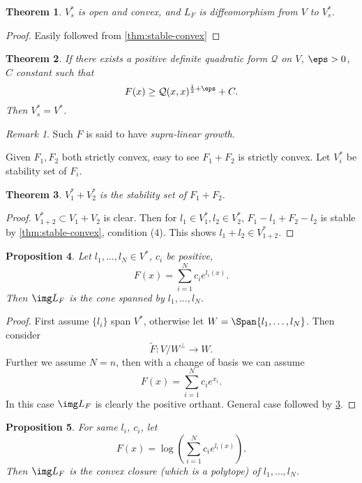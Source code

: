 \documentclass[12pt]{article}
\theoremstyle{plain}\newtheorem{theorem}{Theorem}
\theoremstyle{definition}\newtheorem{definition}[theorem]{Definition}
\theoremstyle{definition}\newtheorem{example}[theorem]{Example}
\theoremstyle{plain}\newtheorem{axiom}[theorem]{Axiom}
\theoremstyle{plain}\newtheorem{assertion}[theorem]{Assertion}
\theoremstyle{plain}\newtheorem{corollary}[theorem]{Corollary}
\theoremstyle{plain}\newtheorem{lemma}[theorem]{Lemma}
\theoremstyle{plain}\newtheorem{proposition}[theorem]{Proposition}
\theoremstyle{plain}\newtheorem{prop}[theorem]{Proposition}
\theoremstyle{plain}\newtheorem{conjecture}[theorem]{Conjecture}
\theoremstyle{plain}\newtheorem{conj}[theorem]{Conjecture}
\theoremstyle{plain}\newtheorem{problem}[theorem]{Problem}
\theoremstyle{remark}\newtheorem{notation}[theorem]{Notation}
\theoremstyle{definition}\newtheorem*{question}{Question}
\theoremstyle{definition}\newtheorem*{answer}{Answer}
\theoremstyle{definition}\newtheorem*{goal}{Goal}
\theoremstyle{plain}\newtheorem*{application}{Application}
\theoremstyle{plain}\newtheorem*{exercise}{Exercise}
\theoremstyle{remark}\newtheorem*{remark}{Remark}
\theoremstyle{remark}\newtheorem*{note}{\small{Note}}
\numberwithin{equation}{section}
\numberwithin{theorem}{section}
\numberwithin{figure}{section}
\begin{document}
\begin{theorem}
    \(V_s^*\) is open and convex, and \(L_F\) is diffeomorphism from \(V\) to
    \(V_s^*\).
\end{theorem}
\begin{proof}
    Easily followed from \cref{thm:stable-convex}
\end{proof}

\begin{theorem}
    If there exists a positive definite quadratic form \(\mathcal{Q}\) on \(V\),
    \(\eps>0\), \(C\) constant such that \[
        F(x)\ge \mathcal{Q}(x,x)^{\frac{1}{2}+\eps}+C
    .\] Then \(V_s^*=V^*\).
\end{theorem}
\begin{remark}
    Such \(F\) is said to have \emph{supra-linear growth}.
\end{remark}

Given \(F_1,F_2\) both strictly convex, easy to see \(F_1+F_2\) is strictly convex.
Let \(V_i^*\) be stability set of \(F_i\).
\begin{theorem}\label{thm:stable-set-sum}
    \(V_1^*+V_2^*\) is the stability set of \(F_1+F_2\).
\end{theorem}
\begin{proof}
    \(V_{1+2}^*\subset V_1+V_2\) is clear. Then for \(l_1\in V_1^*,l_2\in V_2^*\),
    \(F_1-l_1+F_2-l_2\) is stable by \cref{thm:stable-convex}, condition (4).
    This shows \(l_1+l_2\in V_{1+2}^*\).
\end{proof}

\begin{prop}\label{eg:legendre-1}
    Let \(l_1,\ldots,l_N\in V^*\), \(c_i\) be positive, \[
        F(x)=\sum_{i=1}^{N}c_i e^{l_i(x)}
    .\] Then \(\img L_F\) is the cone spanned by \(l_1,\ldots,l_N\).
\end{prop}
\begin{proof}
    First assume \(\{l_i\}\) span \(V^*\), otherwise let \(W=\Span\{l_1,\ldots,l_N\}\).
    Then consider \[
        \tilde{F}\colon V/W^\perp\to W
    .\] Further we assume \(N=n\), then with a change of basis we can assume \[
        F(x)=\sum_{i=1}^{N}c_i e^{x_i}
    .\] In this case \(\img L_F\) is clearly the positive orthant. General case
    followed by \cref{thm:stable-set-sum}.
\end{proof}
\begin{prop}\label{eg:legendre-2}
    For same \(l_i\), \(c_i\), let \[
        F(x)=\log\left(\sum_{i=1}^{N}c_i e^{l_i(x)}\right)
    .\] Then \(\img L_F\) is the convex closure (which is a polytope) of \(l_1,\ldots
    ,l_N\).
\end{prop}
\end{document}

